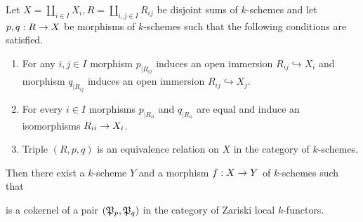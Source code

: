 \begin{lemma}\label{lemma:recollement}
Let $X = \coprod_{i\in I}X_i, R = \coprod_{i,j\in I}R_{ij}$ be disjoint sums of $k$-schemes and let $p,q:R\rightarrow X$ be morphisms of $k$-schemes such that the following conditions are satisfied.
\begin{enumerate}[label=\emph{\textbf{(\arabic*)}}, leftmargin=1.5em]
\item For any $i,j\in I$ morphism $p_{\mid R_{ij}}$ induces an open immersion $R_{ij}\hookrightarrow X_i$ and morphism $q_{\mid R_{ij}}$ induces an open immersion $R_{ij}\hookrightarrow X_j$.
\item For every $i\in I$ morphisms $p_{\mid R_{ii}}$ and $q_{\mid R_{ii}}$ are equal and induce an isomorphisms $R_{ii}\rightarrow X_i$.  
\item Triple $\left(R,p,q\right)$ is an equivalence relation on $X$ in the category of $k$-schemes.
\end{enumerate}
Then there exist a $k$-scheme $Y$ and a morphism $f:X\rightarrow Y$ of $k$-schemes such that
\begin{center}
\end{center}
is a cokernel of a pair $({\mathfrak P}_{p},{\mathfrak P}_{q})$ in the category of Zariski local $k$-functors.
\end{lemma}
